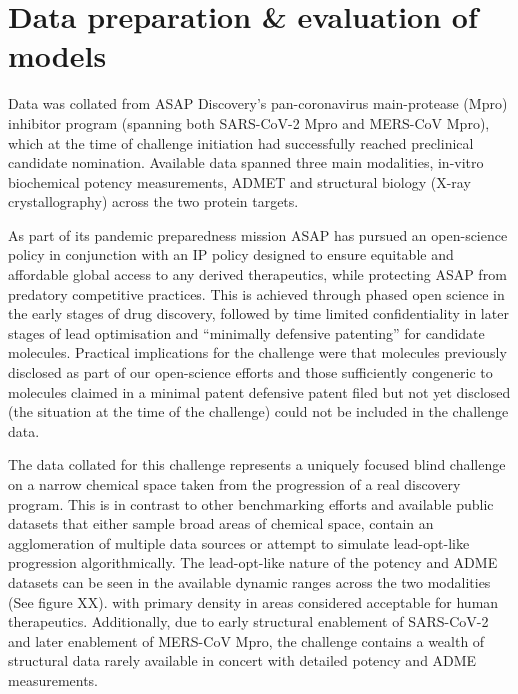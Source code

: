 \documentclass[journal=jacsat,manuscript=article]{achemso}
\begin{document}
\section{Data preparation \& evaluation of models}

Data was collated from ASAP Discovery’s pan-coronavirus main-protease (Mpro) inhibitor program (spanning both SARS-CoV-2 Mpro and MERS-CoV Mpro), which at the time of challenge initiation had successfully reached preclinical candidate nomination. Available data spanned three main modalities, in-vitro biochemical potency measurements, ADMET and structural biology (X-ray crystallography) across the two protein targets. 

As part of its pandemic preparedness mission ASAP has pursued an open-science policy in conjunction with an IP policy designed to ensure equitable and affordable global access to any derived therapeutics, while protecting ASAP from predatory competitive practices. This is achieved through phased open science in the early stages of drug discovery, followed by time limited confidentiality in later stages of lead optimisation and “minimally defensive patenting” for candidate molecules. Practical implications for the challenge were that molecules previously disclosed as part of our open-science efforts and those sufficiently congeneric to molecules claimed in a minimal patent defensive patent filed but not yet disclosed (the situation at the time of the challenge) could not be included in the challenge data.

The data collated for this challenge represents a uniquely focused blind challenge on a narrow chemical space taken from the progression of a real discovery program. This is in contrast to other benchmarking efforts and available public datasets that either sample broad areas of chemical space, contain an agglomeration of multiple data sources or attempt to simulate lead-opt-like progression algorithmically. The lead-opt-like nature of the potency and ADME datasets can be seen in the available dynamic ranges across the two modalities (See figure XX).  with primary density in areas considered acceptable for human therapeutics.  Additionally, due to early structural enablement of SARS-CoV-2 and later enablement of  MERS-CoV Mpro, the challenge contains a wealth of structural data rarely available in concert with detailed potency and ADME measurements.
\end{document}
